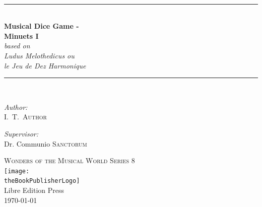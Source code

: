 \documentclass[a4paper,x11names,svgnames,10pt]{article}
\title{\textsc{\mdgBookTitle}}
\author{\textsc{\authorFirstMidNameInit \authorLastName}}
\date{\textsc{\dateGenerated}}
\def\authorFirstMidNameInit{I.\ T.\ }
\def\authorLastName{Author}
\def\dateGenerated{\today}
\def\volNumber{I}
\def\mdgBookTitle{Musical Dice Game - \\[0.15cm] Minuets \volNumber}
\def\mdgBookSubTitle{{\small based on}\\ Ludus Melothedicus ou \\[0.15cm] le Jeu de Dez Harmonique  }
\def\theBookSeries{Wonders of the Musical World Series 8}
\def\theBookPublisher{Libre Edition Press}
\def\theBookPublisherLogo{../images/1ed.png}
\newcommand{\HRule}{\rule{\linewidth}{0.5mm}}
\begin{document}


\newpage
{
${}_{}$\\
\vspace{1.00in}	
\thispagestyle{empty}
\begin{center}
	\HRule \\[0.4cm]
	{\huge \bfseries \mdgBookTitle} \\[0.2cm]
	{\large{\em \mdgBookSubTitle} }\\[0.2cm]
	\HRule \\[1.5cm]
	\begin{minipage}{0.4\textwidth}
		\begin{flushleft} \large
			\emph{Author:}\\
			\authorFirstMidNameInit \textsc{\authorLastName}
		\end{flushleft}
	\end{minipage}
	\begin{minipage}{0.4\textwidth}
		\begin{flushright} \large
			\emph{Supervisor:} \\
			Dr. Communio \textsc{Sanctorum}
		\end{flushright}
	\end{minipage}
	\vfill
	{\textsc{\Large \theBookSeries}}  \\[0.2cm] 
	\texttt{[image: \\theBookPublisherLogo]}\\ 
	{\large \theBookPublisher \\
       \dateGenerated }\\
	\vspace{2.50in}
\end{center}
\newpage


\tableofcontents\label{tabofcon}


\baselineskip 14pt

\newpage
}
\end{document}
